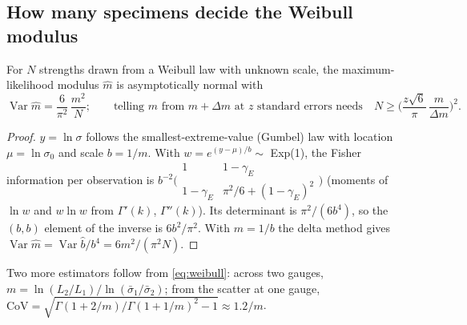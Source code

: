 \subsection{How many specimens decide the Weibull modulus}
\begin{theorem}\label{thm:weibullN}
For $N$ strengths drawn from a Weibull law with unknown scale, the maximum-likelihood modulus $\hat m$ is asymptotically normal with
\begin{equation}
\operatorname{Var}\hat m=\frac{6}{\pi^2}\,\frac{m^2}{N};\qquad\text{telling $m$ from $m+\Delta m$ at $z$ standard errors needs}\quad
N\ge\Big(\frac{z\sqrt6}{\pi}\,\frac{m}{\Delta m}\Big)^2 .\label{eq:weibullN}
\end{equation}
\end{theorem}
\begin{proof}
$y=\ln\sigma$ follows the smallest-extreme-value (Gumbel) law with location $\mu=\ln\sigma_0$ and scale $b=1/m$. With $w=e^{(y-\mu)/b}\sim$
Exp(1), the Fisher information per observation is
$b^{-2}\bigl(\begin{smallmatrix}1&1-\gamma_E\\ 1-\gamma_E&\pi^2/6+(1-\gamma_E)^2\end{smallmatrix}\bigr)$ (moments of $\ln w$ and $w\ln w$ from
$\Gamma'(k)$, $\Gamma''(k)$). Its determinant is $\pi^2/(6b^4)$, so the $(b,b)$ element of the inverse is $6b^2/\pi^2$. With $m=1/b$ the delta
method gives $\operatorname{Var}\hat m=\operatorname{Var}\hat b/b^4=6m^2/(\pi^2N)$.
\end{proof}
\noindent Two more estimators follow from \eqref{eq:weibull}: across two gauges, $m=\ln(L_2/L_1)/\ln(\bar\sigma_1/\bar\sigma_2)$; from the scatter at
one gauge, $\mathrm{CoV}=\sqrt{\Gamma(1+2/m)/\Gamma(1+1/m)^2-1}\approx1.2/m$.

